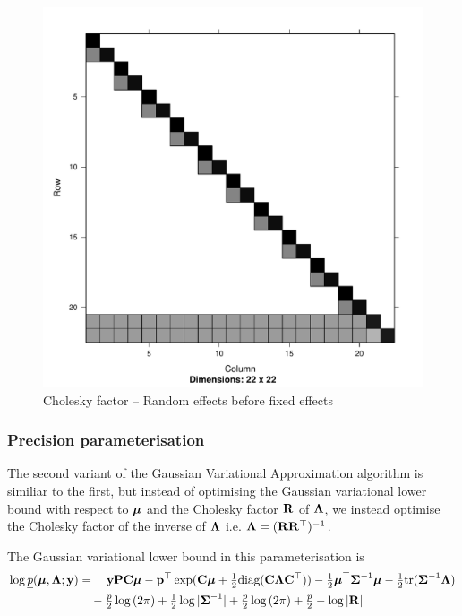 \documentclass{amsart}[12pt]
\begin{document}
	\begin{figure}[p]
		\caption{\tiny Cholesky factor -- Random effects before fixed effects}
		\label{fig:cholrandomfixed}
		\includegraphics[scale=.25]{mZ_mX_cholesky.pdf}
	\end{figure}
	
	\subsubsection{Precision parameterisation}
		
	\noindent The second variant of the Gaussian Variational Approximation algorithm is similiar to the first, but
	instead of optimising the Gaussian variational lower bound with respect to ${\boldsymbol \mu}$ and the Cholesky factor
	${\bf R}$ of ${\boldsymbol \Lambda}$, we instead optimise the Cholesky factor of the inverse of ${\boldsymbol \Lambda}$ i.e. ${\boldsymbol \Lambda} =
	({\bf R} {\bf R}^\top)^{-1}$.

	The Gaussian variational lower bound in this parameterisation is
	\begin{align*}
		\log \underline{p}({\boldsymbol \mu}, {\boldsymbol \Lambda}; {\bf y}) & = \quad {\bf y}{\bf P}{\bf C} {\boldsymbol\mu} - {\bf p}^\top \exp({\bf C} {\boldsymbol \mu} + \tfrac{1}{2} \text{diag}({\bf C} {\boldsymbol \Lambda} {\bf C}^\top)) - \tfrac{1}{2} {\boldsymbol \mu}^\top {\boldsymbol\Sigma}^{-1} {\boldsymbol \mu} - \tfrac{1}{2} \text{tr}{({\boldsymbol\Sigma}^{-1} {\boldsymbol\Lambda})} \\
		                                        & \quad- \tfrac{p}{2} \log{(2 \pi)} + \tfrac{1}{2} \log{|{\boldsymbol\Sigma}^{-1}|} + \tfrac{p}{2} \log{(2 \pi)} + \tfrac{p}{2} - \log{|{\bf R}|}                                             
	\end{align*}
		
\end{document}
